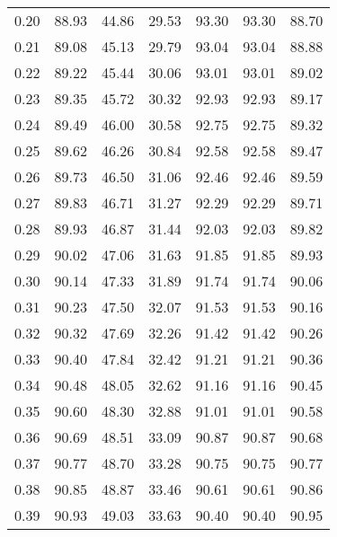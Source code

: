 \begin{tabular}{|c|c|c|c|c|c|c|}
      0.20 &     88.93 &     44.86 &      29.53 &   93.30 &      93.30 &         88.70 \\
      0.21 &     89.08 &     45.13 &      29.79 &   93.04 &      93.04 &         88.88 \\
      0.22 &     89.22 &     45.44 &      30.06 &   93.01 &      93.01 &         89.02 \\
      0.23 &     89.35 &     45.72 &      30.32 &   92.93 &      92.93 &         89.17 \\
      0.24 &     89.49 &     46.00 &      30.58 &   92.75 &      92.75 &         89.32 \\
      0.25 &     89.62 &     46.26 &      30.84 &   92.58 &      92.58 &         89.47 \\
      0.26 &     89.73 &     46.50 &      31.06 &   92.46 &      92.46 &         89.59 \\
      0.27 &     89.83 &     46.71 &      31.27 &   92.29 &      92.29 &         89.71 \\
      0.28 &     89.93 &     46.87 &      31.44 &   92.03 &      92.03 &         89.82 \\
      0.29 &     90.02 &     47.06 &      31.63 &   91.85 &      91.85 &         89.93 \\
      0.30 &     90.14 &     47.33 &      31.89 &   91.74 &      91.74 &         90.06 \\
      0.31 &     90.23 &     47.50 &      32.07 &   91.53 &      91.53 &         90.16 \\
      0.32 &     90.32 &     47.69 &      32.26 &   91.42 &      91.42 &         90.26 \\
      0.33 &     90.40 &     47.84 &      32.42 &   91.21 &      91.21 &         90.36 \\
      0.34 &     90.48 &     48.05 &      32.62 &   91.16 &      91.16 &         90.45 \\
      0.35 &     90.60 &     48.30 &      32.88 &   91.01 &      91.01 &         90.58 \\
      0.36 &     90.69 &     48.51 &      33.09 &   90.87 &      90.87 &         90.68 \\
      0.37 &     90.77 &     48.70 &      33.28 &   90.75 &      90.75 &         90.77 \\
      0.38 &     90.85 &     48.87 &      33.46 &   90.61 &      90.61 &         90.86 \\
      0.39 &     90.93 &     49.03 &      33.63 &   90.40 &      90.40 &         90.95 \\

\end{tabular}
